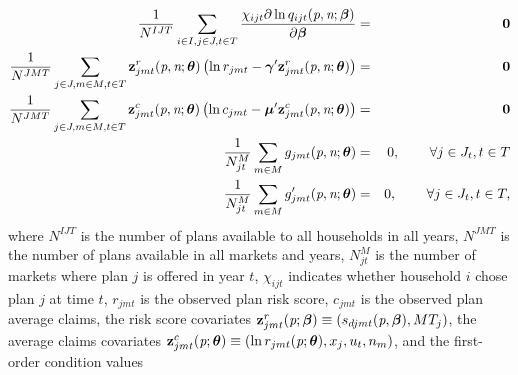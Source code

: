 \documentclass[12pt]{article}
\begin{document}
\vspace{-0.4in}
\begin{eqnarray}
\label{eqn:moment_conditions}
	\frac{1}{N^{IJT}} \sum_{i\in I, j \in J, t \in T} \frac{ \chi_{ijt} \partial  \ln  q_{ijt}(\textit{p},\textit{n};\boldsymbol{\beta})}{\partial \boldsymbol{\beta}} &=& {\bf 0} \nonumber \\
	\frac{1}{N^{JMT}} \sum_{j \in J,m \in M,t \in T} {\bf z}_{jmt}^r(\textit{p},\textit{n};\boldsymbol{\theta}) \left(\ln r_{jmt} - \boldsymbol{\gamma}'   {\bf z}_{jmt}^r(\textit{p},\textit{n};\boldsymbol{\theta}) \right)  &=& {\bf 0} \nonumber  \\ 
	\frac{1}{N^{JMT}} \sum_{j \in J,m \in M,t \in T} {\bf z}_{jmt}^c(\textit{p},\textit{n};\boldsymbol{\theta}) \left(\ln c_{jmt} - \boldsymbol{\mu}'   {\bf z}_{jmt}^c(\textit{p},\textit{n};\boldsymbol{\theta}) \right)  &=& {\bf 0} \nonumber  \\ 	
	\frac{1}{N_{jt}^M} \sum_{m \in M} g_{jmt}(\textit{p},\textit{n};\boldsymbol{\theta}) &=& 0,  \hspace{0.3in} \forall j \in J_t,t \in T \nonumber \\
	\frac{1}{N_{jt}^M} \sum_{m \in M} g'_{jmt}(\textit{p},\textit{n};\boldsymbol{\theta}) &=& 0,  \hspace{0.3in} \forall j \in J_t,t \in T ,
\end{eqnarray}
where $N^{IJT}$ is the number of plans available to all households in all years, $N^{JMT}$ is the number of plans available in all markets and years, $N_{jt}^M$ is the number of markets where plan $j$ is offered in year $t$, $\chi_{ijt}$ indicates whether household $i$ chose plan $j$ at time $t$, $r_{jmt}$ is the observed plan risk score, $c_{jmt}$ is the observed plan average claims, the risk score covariates ${\bf z}_{jmt}^r(\textit{p};\boldsymbol{\beta}) \equiv (s_{djmt}(\textit{p},\boldsymbol{\beta}),MT_j)$, the average claims covariates ${\bf z}_{jmt}^c(\textit{p};\boldsymbol{\theta}) \equiv (\ln r_{jmt}(\textit{p};\boldsymbol{\theta}),x_j,u_t,n_m)$, and the first-order condition values
\end{document}

